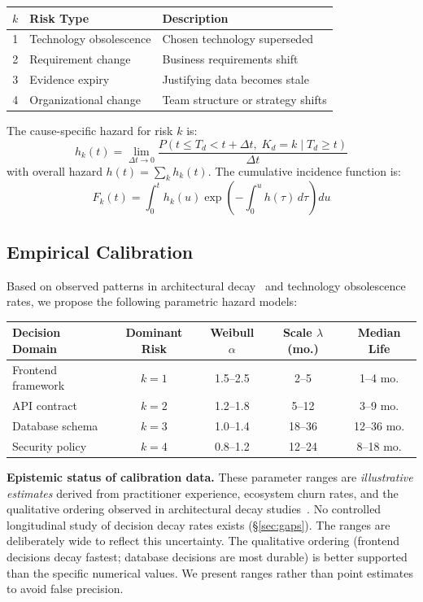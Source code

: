 \documentclass[11pt, a4paper, logo, copyright]{googledeepmind}
\begin{document}
\begin{center}
\begin{tabular}{clp{7cm}}
\toprule
$k$ & Risk Type & Description \\
\midrule
1 & Technology obsolescence & Chosen technology superseded \\
2 & Requirement change & Business requirements shift \\
3 & Evidence expiry & Justifying data becomes stale \\
4 & Organizational change & Team structure or strategy shifts \\
\bottomrule
\end{tabular}
\end{center}

The cause-specific hazard for risk $k$ is:
\begin{equation}
    h_k(t) = \lim_{\Delta t \to 0} \frac{P(t \leq T_d < t + \Delta t, \; K_d = k \mid T_d \geq t)}{\Delta t}
\end{equation}
with overall hazard $h(t) = \sum_k h_k(t)$. The cumulative incidence function is:
\begin{equation}
    F_k(t) = \int_0^t h_k(u) \exp\!\left(-\int_0^u h(\tau)\, d\tau\right) du
\end{equation}

\subsection{Empirical Calibration}

Based on observed patterns in architectural decay~\citep{le2018} and technology obsolescence rates, we propose the following parametric hazard models:

\begin{center}
\begin{tabular}{lcccc}
\toprule
Decision Domain & Dominant Risk & Weibull $\alpha$ & Scale $\lambda$ (mo.) & Median Life \\
\midrule
Frontend framework & $k=1$ & 1.5--2.5 & 2--5 & 1--4 mo. \\
API contract & $k=2$ & 1.2--1.8 & 5--12 & 3--9 mo. \\
Database schema & $k=3$ & 1.0--1.4 & 18--36 & 12--36 mo. \\
Security policy & $k=4$ & 0.8--1.2 & 12--24 & 8--18 mo. \\
\bottomrule
\end{tabular}
\end{center}

\textbf{Epistemic status of calibration data.} These parameter ranges are \emph{illustrative estimates} derived from practitioner experience, ecosystem churn rates, and the qualitative ordering observed in architectural decay studies~\citep{le2018, herraiz2021}. No controlled longitudinal study of decision decay rates exists (\S\ref{sec:gaps}). The ranges are deliberately wide to reflect this uncertainty. The qualitative ordering (frontend decisions decay fastest; database decisions are most durable) is better supported than the specific numerical values. We present ranges rather than point estimates to avoid false precision.
\end{document}
